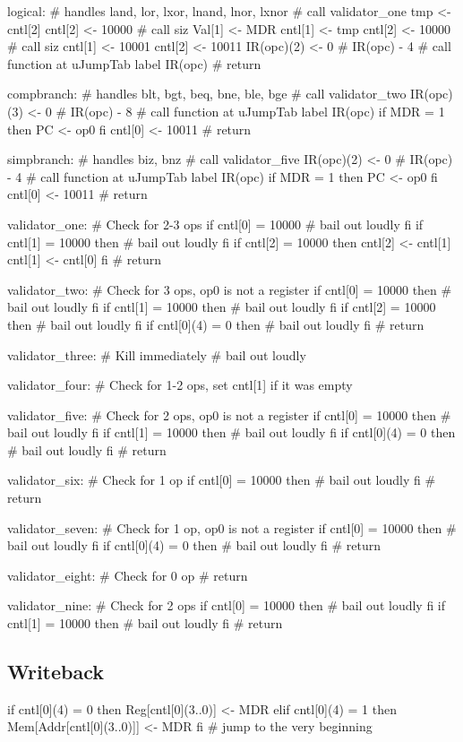 \documentclass[12pt]{article}
\begin{document}
\begin{verbatimtab}
logical: # handles land, lor, lxor, lnand, lnor, lxnor
	# call validator_one
	tmp <- cntl[2]
	cntl[2] <- 10000
	# call siz
	Val[1] <- MDR
	cntl[1] <- tmp
	cntl[2] <- 10000
	# call siz
	cntl[1] <- 10001
	cntl[2] <- 10011
	IR(opc)(2) <- 0 # IR(opc) - 4
	# call function at uJumpTab label IR(opc)
	# return

compbranch: # handles blt, bgt, beq, bne, ble, bge
	# call validator_two
	IR(opc)(3) <- 0 # IR(opc) - 8
	# call function at uJumpTab label IR(opc)
	if MDR = 1 then
		PC <- op0
	fi
	cntl[0] <- 10011
	# return

simpbranch: # handles biz, bnz
	# call validator_five
	IR(opc)(2) <- 0 # IR(opc) - 4
	# call function at uJumpTab label IR(opc)
	if MDR = 1 then
		PC <- op0
	fi
	cntl[0] <- 10011
	# return

validator_one:
	# Check for 2-3 ops
	if cntl[0] = 10000
		# bail out loudly
	fi
	if cntl[1] = 10000 then
		# bail out loudly
	fi
	if cntl[2] = 10000 then
		cntl[2] <- cntl[1]
		cntl[1] <- cntl[0]
	fi
	# return

validator_two:
	# Check for 3 ops, op0 is not a register
	if cntl[0] = 10000 then
		# bail out loudly
	fi
	if cntl[1] = 10000 then
		# bail out loudly
	fi
	if cntl[2] = 10000 then
		# bail out loudly
	fi
	if cntl[0](4) = 0 then
		# bail out loudly
	fi
	# return

validator_three:
	# Kill immediately
	# bail out loudly

validator_four:
	# Check for 1-2 ops, set cntl[1] if it was empty

validator_five:
	# Check for 2 ops, op0 is not a register
	if cntl[0] = 10000 then
		# bail out loudly
	fi
	if cntl[1] = 10000 then
		# bail out loudly
	fi
	if cntl[0](4) = 0 then
		# bail out loudly
	fi
	# return

validator_six:
	# Check for 1 op
	if cntl[0] = 10000 then
		# bail out loudly
	fi
	# return

validator_seven:
	# Check for 1 op, op0 is not a register
	if cntl[0] = 10000 then
		# bail out loudly
	fi
	if cntl[0](4) = 0 then
		# bail out loudly
	fi
	# return

validator_eight:
	# Check for 0 op
	# return

validator_nine:
	# Check for 2 ops
	if cntl[0] = 10000 then
		# bail out loudly
	fi
	if cntl[1] = 10000 then
		# bail out loudly
	fi
	# return
\end{verbatimtab}

\subsection{Writeback}
\begin{verbatimtab}
if cntl[0](4) = 0 then
	Reg[cntl[0](3..0)] <- MDR
elif cntl[0](4) = 1 then
	Mem[Addr[cntl[0](3..0)]] <- MDR
fi
# jump to the very beginning
\end{verbatimtab}
\end{document}
